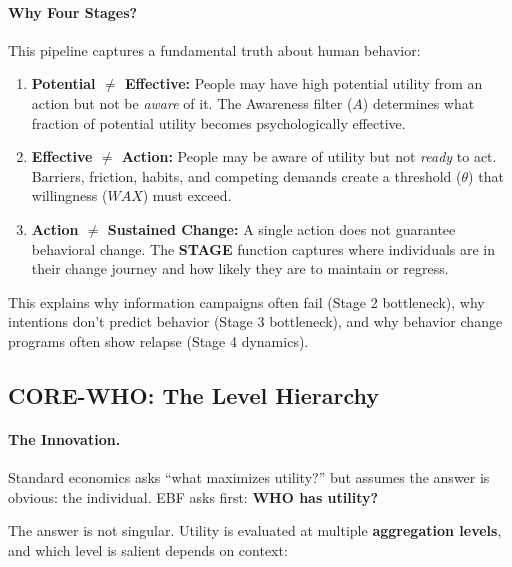 \paragraph{Why Four Stages?}
This pipeline captures a fundamental truth about human behavior:

\begin{enumerate}
\item \textbf{Potential $\neq$ Effective:} People may have high potential utility
from an action but not be \emph{aware} of it. The Awareness filter ($A$)
determines what fraction of potential utility becomes psychologically effective.

\item \textbf{Effective $\neq$ Action:} People may be aware of utility but not
\emph{ready} to act. Barriers, friction, habits, and competing demands create
a threshold ($\theta$) that willingness ($WAX$) must exceed.

\item \textbf{Action $\neq$ Sustained Change:} A single action does not guarantee
behavioral change. The \textbf{STAGE} function captures where individuals are
in their change journey and how likely they are to maintain or regress.
\end{enumerate}

This explains why information campaigns often fail (Stage 2 bottleneck),
why intentions don't predict behavior (Stage 3 bottleneck), and why behavior
change programs often show relapse (Stage 4 dynamics).

\subsection{CORE-WHO: The Level Hierarchy}
\label{sec:8c-who}

\paragraph{The Innovation.}
Standard economics asks ``what maximizes utility?'' but assumes the answer is
obvious: the individual. EBF asks first: \textbf{WHO has utility?}

The answer is not singular. Utility is evaluated at multiple \textbf{aggregation
levels}, and which level is salient depends on context:

